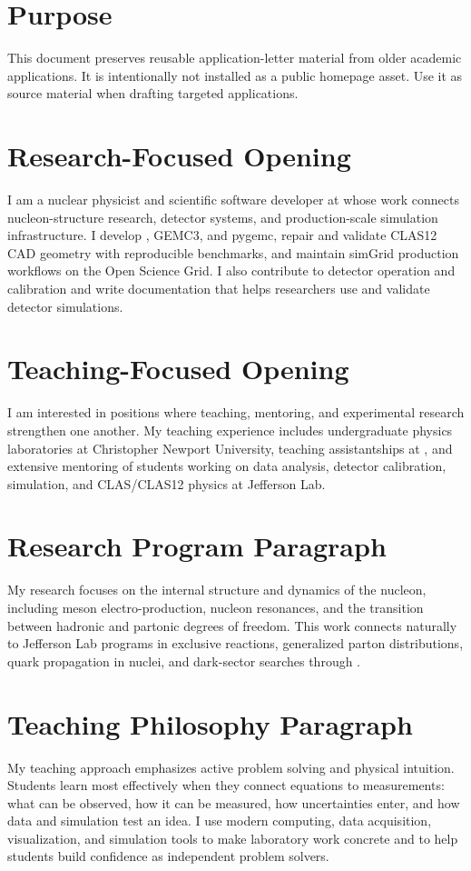 \documentclass[11pt,letterpaper]{article}
\begin{document}

\section*{Purpose}
This document preserves reusable application-letter material from older
academic applications. It is intentionally not installed as a public homepage
asset. Use it as source material when drafting targeted applications.

\section*{Research-Focused Opening}
I am a nuclear physicist and scientific software developer at \MauriJLab{} whose
work connects nucleon-structure research, detector systems, and production-scale
simulation infrastructure. I develop \MauriGEMC{}, GEMC3, and pygemc, repair and
validate CLAS12 CAD geometry with reproducible benchmarks, and maintain simGrid
production workflows on the Open Science Grid. I also contribute to detector
operation and calibration and write documentation that helps researchers use
and validate detector simulations.

\section*{Teaching-Focused Opening}
I am interested in positions where teaching, mentoring, and experimental
research strengthen one another. My teaching experience includes undergraduate
physics laboratories at Christopher Newport University, teaching assistantships
at \MauriRPI{}, and extensive mentoring of students working on data analysis,
detector calibration, simulation, and CLAS/CLAS12 physics at Jefferson Lab.

\section*{Research Program Paragraph}
My research focuses on the internal structure and dynamics of the nucleon,
including meson electro-production, nucleon resonances, and the transition
between hadronic and partonic degrees of freedom. This work connects naturally
to Jefferson Lab programs in exclusive reactions, generalized parton
distributions, quark propagation in nuclei, and dark-sector searches through
\MauriHPS{}.

\section*{Teaching Philosophy Paragraph}
My teaching approach emphasizes active problem solving and physical intuition.
Students learn most effectively when they connect equations to measurements:
what can be observed, how it can be measured, how uncertainties enter, and how
data and simulation test an idea. I use modern computing, data acquisition,
visualization, and simulation tools to make laboratory work concrete and to help
students build confidence as independent problem solvers.
\end{document}
